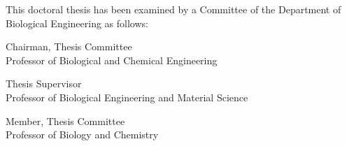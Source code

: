 \begin{titlepage}
\begin{large}
This doctoral thesis has been examined by a Committee of the Department
of Biological Engineering as follows:

\signature{Professor K. Dane Wittrup}{Chairman, Thesis Committee \\
   Professor of Biological and Chemical Engineering}

\signature{Professor Angela M. Belcher}{Thesis Supervisor \\
   Professor of Biological Engineering and Material Science}

\signature{Professor Catherine L. Drennan}{Member, Thesis Committee \\
   Professor of Biology and Chemistry}
\end{large}
\end{titlepage}
